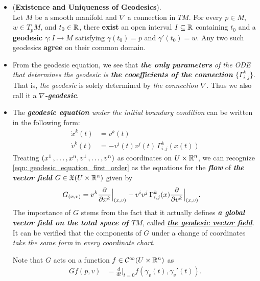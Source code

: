 \documentclass[11pt]{article}
\begin{document}
\begin{itemize}
\item \begin{theorem}(\textbf{Existence and Uniqueness of Geodesics}). \citep{lee2018introduction} \\
Let $M$ be a smooth manifold and $\nabla$ a connection in $TM$. For every $p \in M$, $w \in T_{p}M$, and $t_0 \in {\mathbb R}$, there \textbf{exist} an open interval $I \subseteq {\mathbb R}$ containing $t_0$ and a \textbf{geodesic} $\gamma: I \rightarrow M$  satisfying $\gamma(t_0) = p$ and $\gamma'(t_0) = w$. Any two such geodesics \textbf{agree} on their common domain.
\end{theorem}

\item \begin{remark}
From the geodesic equation, we see that \emph{\textbf{the only parameters} of the ODE that determines the geodesic is \textbf{the cooefficients of the connection} $\{\Gamma_{i,j}^{k}\}$}. That is, \emph{the geodesic} is solely determined by \emph{the connection $\nabla$}. Thus we also call it a \emph{\textbf{$\nabla$-geodesic}}.
\end{remark}

\item \begin{remark} The \emph{\textbf{geodesic equation} under the initial boundary condition} can be written in the following form:
\begin{align}
\dot{x}^k(t) &= v^{k}(t) \\
\dot{v}^k(t) &= - v^{i}(t)v^j(t)\,\Gamma_{i,j}^{k}(x(t)) \label{eqn: geodesic_equation_first_order}
\end{align} Treating $(x^1 \,{,}\ldots{,}\, x^n, v^1 \,{,}\ldots{,}\, v^n)$ as coordinates on $U \times {\mathbb R}^n$, we can recognize \eqref{eqn: geodesic_equation_first_order} as the equations for the \textbf{\emph{flow}} of \textbf{\emph{the vector field}} $G \in {\mathfrak X}(U \times {\mathbb R}^n)$ given by
\begin{align}
G_{(x, v)} &= v^k\frac{\partial }{ \partial x^k}\Bigr|_{(x, v)} - v^{i}v^j\,\Gamma_{i,j}^{k}(x)\frac{\partial }{ \partial v^k}\Bigr|_{(x, v)}.
\end{align} The importance of $G$ stems from the fact that it actually defines \emph{\textbf{a global vector field on the total space of $TM$}}, called \underline{\emph{\textbf{the geodesic vector field}}}. It can be verified that the components of $G$ under a change of coordinates \emph{take the same form} in \emph{every coordinate chart}.

Note that $G$ acts on a function $f \in {\mathcal C}^{\infty}(U \times {\mathbb R}^n)$ as
\begin{align}
Gf(p, v) &= \frac{d}{dt}\Bigr|_{t=0}f(\gamma_v(t), \gamma_v'(t)). \label{eqn: geodesic_vector_field_act_function}
\end{align}
\end{remark}


\end{itemize}
\end{document}
